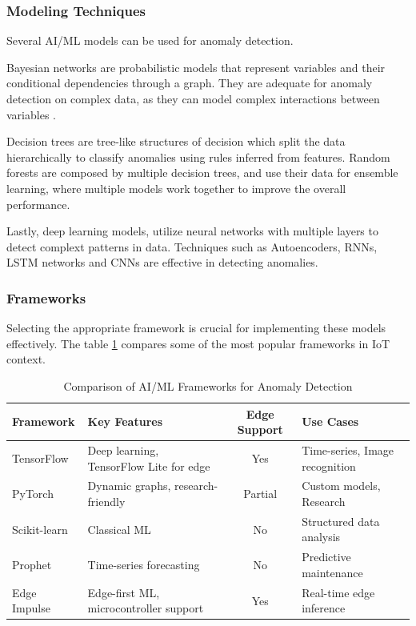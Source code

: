 \subsubsection{Modeling Techniques}
Several \gls{AI}/\gls{ML} models can be used for anomaly detection.

Bayesian networks are probabilistic models that represent variables and their
conditional dependencies through a graph. They are adequate for anomaly
detection on complex data, as they can model complex interactions between
variables \cite{BayesServerIntro, BayesServerAnomaly}.

Decision trees are tree-like structures of decision which split the data
hierarchically to classify anomalies using rules inferred from features.
Random forests are composed by multiple decision trees, and use their data
for ensemble learning, where multiple models work together to improve the
overall performance. \cite{Zhang2022}

Lastly, deep learning models, utilize neural networks with multiple layers
to detect complext patterns in data. Techniques such as Autoencoders, \gls{RNN}s,
\gls{LSTM} networks and \gls{CNN}s are effective in detecting anomalies\cite{BHAROT2024574}.

\subsubsection{Frameworks}
Selecting the appropriate framework is crucial for implementing these models
effectively. The table \ref{tab:ai-ml:frameworks}
compares some of the most popular frameworks in \gls{IoT} context.

\begin{table}[ht]
	\centering
	\caption{Comparison of \gls{AI}/\gls{ML} Frameworks for Anomaly Detection}
	\label{tab:ai-ml:frameworks}
	\begin{tabular}{p{3cm}p{4cm}cp{4cm}}
		\toprule
		\textbf{Framework} & \textbf{Key Features}                        & \textbf{Edge Support} & \textbf{Use Cases}             \\
		\midrule
		TensorFlow         & Deep learning, TensorFlow Lite for edge      & Yes                   & Time-series, Image recognition \\
		\midrule
		PyTorch            & Dynamic graphs, research-friendly            & Partial               & Custom models, Research        \\
		\midrule
		Scikit-learn       & Classical \gls{ML}                           & No                    & Structured data analysis       \\
		\midrule
		Prophet            & Time-series forecasting                      & No                    & Predictive maintenance         \\
		\midrule
		Edge Impulse       & Edge-first \gls{ML}, microcontroller support & Yes                   & Real-time edge inference       \\
		\bottomrule
	\end{tabular}
\end{table}

